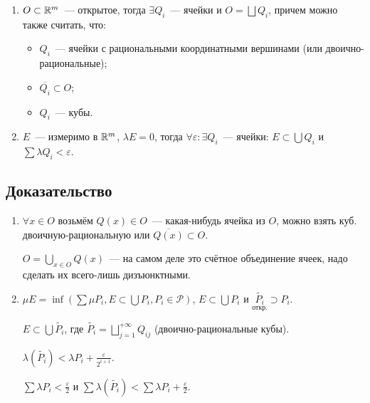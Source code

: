 \documentclass{article}
\begin{document}
        \begin{enumerate}
        
            \item $O \subset \mathbb{R}^m$~--- открытое, тогда $\exists Q_i$~--- ячейки и $O = \bigsqcup Q_i$, причем можно также считать, что:
            
                \begin{itemize}
                
                    \item $Q_i$~--- ячейки с рациональными координатными вершинами (или двоично-рациональные);
                    
                    \item $\overline{Q_i} \subset O$;
                    
                    \item $Q_i$~--- кубы.
                    
                \end{itemize}
                
            \item $E$~--- измеримо в $\mathbb{R}^m$, $\lambda E = 0$, тогда $\forall \varepsilon : \exists Q_i$~--- ячейки: $E \subset \bigcup Q_i$ и $\sum \lambda Q_i < \varepsilon$.
            
        \end{enumerate}
            
        \subsection{Доказательство}
        
            \begin{enumerate}
            
                \item $\forall x \in O$ возьмём $Q(x) \in O$~--- какая-нибудь ячейка из $O$, можно взять куб. двоичную-рациональную или $\overline{Q(x)} \subset O$.
            
                    $O = \bigcup\limits_{x \in O} Q(x)$~--- на самом деле это счётное объединение ячеек, надо сделать их всего-лишь дизъюнктными.
            
                \item $\mu E = \inf \left( \sum \mu P_i, E \subset \bigcup P_i, P_i \in \mathcal{P} \right)$, $E \subset \bigcup P_i$ и $\underset{\text{откр.}}{\widetilde{P_i}} \supset P_i$.
                
                    $E \subset \bigcup \widetilde{P_i}$, где $\widetilde{P_i} = \bigsqcup\limits^{+\infty}_{j = 1} Q_{ij}$ (двоично-рациональные кубы).
                    
                    $\lambda ( \widetilde{P_i} ) < \lambda P_i + \frac{\varepsilon}{2^{i + 1}}$.
                    
                    $\sum \lambda P_i < \frac{\varepsilon}{2}$ и $\sum \lambda \left( \widetilde{P_i} \right) < \sum \lambda P_i + \frac{\varepsilon}{2}$.
                
            \end{enumerate}
            
\end{document}
